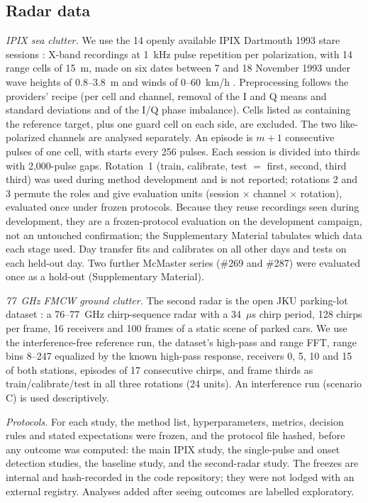\documentclass[journal]{IEEEtran}
\begin{document}
\subsection{Radar data}
\emph{IPIX sea clutter.} We use the 14 openly available IPIX Dartmouth 1993 stare sessions \cite{ipixweb}: X-band recordings at 1~kHz pulse repetition per polarization, with 14 range cells of 15~m, made on six dates between 7 and 18 November 1993 under wave heights of 0.8--3.8~m and winds of 0--60~km/h \cite{haykin1995,farina1997,haykin2002}. Preprocessing follows the providers' recipe (per cell and channel, removal of the I and Q means and standard deviations and of the I/Q phase imbalance). Cells listed as containing the reference target, plus one guard cell on each side, are excluded. The two like-polarized channels are analysed separately. An episode is $m+1$ consecutive pulses of one cell, with starts every 256 pulses. Each session is divided into thirds with 2,000-pulse gaps. Rotation~1 (train, calibrate, test $=$ first, second, third third) was used during method development and is not reported; rotations 2 and 3 permute the roles and give \NUnitsConf{} evaluation units (session $\times$ channel $\times$ rotation), evaluated once under frozen protocols. Because they reuse recordings seen during development, they are a frozen-protocol evaluation on the development campaign, not an untouched confirmation; the Supplementary Material tabulates which data each stage used. Day transfer fits and calibrates on all other days and tests on each held-out day. Two further McMaster series (\#269 and \#287) were evaluated once as a hold-out (Supplementary Material).

\emph{77~GHz FMCW ground clutter.} The second radar is the open JKU parking-lot dataset \cite{jku2026}: a 76--77~GHz chirp-sequence radar with a 34~$\mu$s chirp period, 128 chirps per frame, 16 receivers and 100 frames of a static scene of parked cars. We use the interference-free reference run, the dataset's high-pass and range FFT, range bins 8--247 equalized by the known high-pass response, receivers 0, 5, 10 and 15 of both stations, episodes of 17 consecutive chirps, and frame thirds as train/calibrate/test in all three rotations (24 units). An interference run (scenario C) is used descriptively.

\emph{Protocols.} For each study, the method list, hyperparameters, metrics, decision rules and stated expectations were frozen, and the protocol file hashed, before any outcome was computed: the main IPIX study, the single-pulse and onset detection studies, the baseline study, and the second-radar study. The freezes are internal and hash-recorded in the code repository; they were not lodged with an external registry. Analyses added after seeing outcomes are labelled exploratory.
\end{document}

